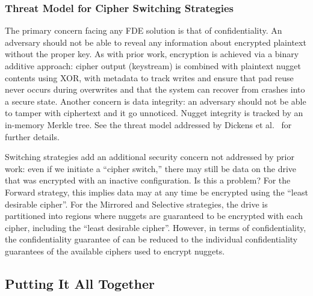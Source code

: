 \subsubsection{Threat Model for Cipher Switching Strategies}

The primary concern facing any FDE solution is that of confidentiality. An
adversary should not be able to reveal any information about encrypted plaintext
without the proper key. As with prior work, encryption is achieved via a binary
additive approach: cipher output (keystream) is combined with plaintext nugget
contents using XOR, with metadata to track writes and ensure that pad reuse
never occurs during overwrites and that the system can recover from crashes into
a secure state. Another concern is data integrity: an adversary should not be
able to tamper with ciphertext and it go unnoticed. Nugget integrity is tracked
by an in-memory Merkle tree. See the threat model addressed by Dickens et
al.~\cite{StrongBox} for further details.

Switching strategies add an additional security concern not addressed by prior
work: even if we initiate a ``cipher switch,'' there may still be data on the
drive that was encrypted with an inactive configuration. Is this a problem? For
the Forward strategy, this implies data may at any time be encrypted using the
``least desirable cipher''. For the Mirrored and Selective strategies, the drive
is partitioned into regions where nuggets are guaranteed to be encrypted with
each cipher, including the ``least desirable cipher''. However, in terms of
confidentiality, the confidentiality guarantee of \sys can be reduced to
the individual confidentiality guarantees of the available ciphers used to
encrypt nuggets.

\subsection{Putting It All Together} \label{subsec:summary}

